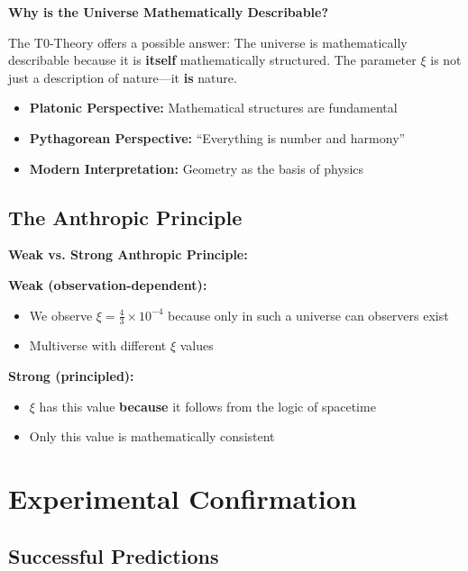 \documentclass[12pt,a4paper]{article}
\newcommand{\xipar}{\xi}
\begin{document}
	\begin{foundation}
		\textbf{Why is the Universe Mathematically Describable?}
		
		The T0-Theory offers a possible answer: The universe is mathematically describable because it is \textbf{itself} mathematically structured. The parameter $\xipar$ is not just a description of nature---it \textbf{is} nature.
		
		\begin{itemize}
			\item \textbf{Platonic Perspective:} Mathematical structures are fundamental
			\item \textbf{Pythagorean Perspective:} ``Everything is number and harmony''
			\item \textbf{Modern Interpretation:} Geometry as the basis of physics
		\end{itemize}
	\end{foundation}
	
	\subsection{The Anthropic Principle}
	
	\begin{alternative}
		\textbf{Weak vs. Strong Anthropic Principle:}
		
		\textbf{Weak (observation-dependent):}
		\begin{itemize}
			\item We observe $\xipar = \frac{4}{3} \times 10^{-4}$ because only in such a universe can observers exist
			\item Multiverse with different $\xipar$ values
		\end{itemize}
		
		\textbf{Strong (principled):}
		\begin{itemize}
			\item $\xipar$ has this value \textbf{because} it follows from the logic of spacetime
			\item Only this value is mathematically consistent
		\end{itemize}
	\end{alternative}
	
	
	
	
	\section{Experimental Confirmation}
	
	\subsection{Successful Predictions}
	
\end{document}
